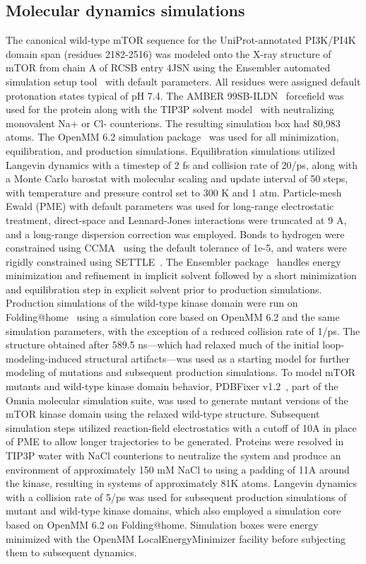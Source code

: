 \documentclass[phd,tocprelim]{cornell}
\begin{document}
\subsection{Molecular dynamics simulations}
The canonical wild-type mTOR sequence for the UniProt-annotated PI3K/PI4K domain span (residues 2182-2516) was modeled onto the X-ray structure of mTOR from chain A of
RCSB entry 4JSN using the Ensembler automated simulation setup tool~\citep{Parton:2016cc} with default parameters. All residues were assigned default protonation states typical of pH 7.4. The AMBER 99SB-ILDN~\citep{LindorffLarsen:2010ei} forcefield was used for the protein along with the TIP3P solvent model~\citep{Jorgensen:1998fl} with neutralizing monovalent Na+ or Cl- counterions. The resulting simulation box had 80,983 atoms. The OpenMM 6.2 simulation package~\citep{Eastman:2017kn} was used for all minimization, equilibration, and production simulations. Equilibration simulations utilized Langevin dynamics with a timestep of 2 fs and collision rate of 20/ps, along with a Monte Carlo barostat with molecular scaling and update interval of 50 steps, with temperature and pressure control set to 300 K and 1 atm. Particle-mesh Ewald (PME) with default parameters was used for long-range electrostatic treatment, direct-space and Lennard-Jones interactions were truncated at 9 A, and a long-range dispersion correction was employed. Bonds to hydrogen were constrained using CCMA~\citep{Eastman:2010hq} using the default tolerance of 1e-5, and waters were rigidly constrained using SETTLE~\citep{Miyamoto:1992fx}. The Ensembler package~\citep{Parton:2016cc} handles energy minimization and refinement in implicit solvent followed by a short minimization and equilibration step in explicit solvent prior to production simulations.
Production simulations of the wild-type kinase domain were run on Folding@home~\citep{Shirts:2000du} using a simulation core based on OpenMM 6.2 and the same simulation parameters, with the exception of a reduced collision rate of 1/ps. The structure obtained after 589.5 ns---which had relaxed much of the initial loop-modeling-induced structural artifacts---was used as a starting model for further modeling of mutations and subsequent production simulations.
To model mTOR mutants and wild-type kinase domain behavior, PDBFixer v1.2~\citep{Eastman:2013bo}, part of the Omnia molecular simulation suite, was used to generate mutant versions of the mTOR kinase domain using the relaxed wild-type structure. Subsequent simulation steps utilized reaction-field electrostatics with a cutoff of 10A in place of PME to allow longer trajectories to be generated. Proteins were resolved in TIP3P water with NaCl counterions to neutralize the system and produce an environment of approximately 150 mM NaCl to using a padding of 11A around the kinase, resulting in systems of approximately 81K atoms. Langevin dynamics with a collision rate of 5/ps was used for subsequent production simulations of mutant and wild-type kinase domains, which also employed a simulation core based on OpenMM 6.2 on Folding@home. Simulation boxes were energy minimized with the OpenMM LocalEnergyMinimizer facility before subjecting them to subsequent dynamics.
\end{document}
